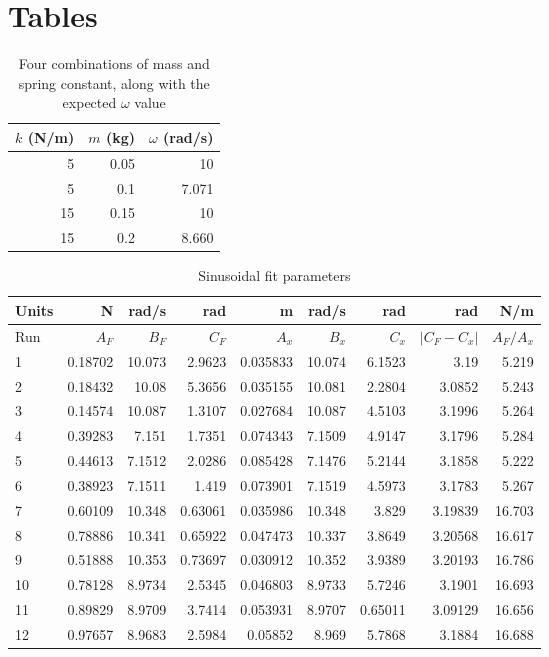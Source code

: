 \section{Tables}
%
\begin{table}[ht]
    \centering
    \begin{tabular}{|r|r|r|}\hline
        $k$ (N/m) & $m$ (kg) & $\omega$ (rad/s) \\ \hline
        5 & 0.05 & 10 \\
        5 & 0.1 & 7.071 \\
        15 & 0.15 & 10 \\
        15 & 0.2 & 8.660 \\
        \hline
    \end{tabular}
    \caption{Four combinations of mass and spring constant, along with the expected $\omega$ value}
    \label{table.11.parameters}
\end{table}
%
\begin{table}[ht]
    \centering
    \begin{tabular}{|l|r|r|r|r|r|r|r|r|}
        \hline
        Units & N & rad/s & rad & m & rad/s & rad & rad & N/m \\
        \hline
        Run & $A_{F}$ & $B_{F}$ & $C_{F}$ & $A_{x}$ & $B_{x}$ & $C_{x}$ & $\vert C_{F} - C_{x} \vert$ & $A_{F} / A_{x}$ \\
        \hline
        1 & 0.18702 & 10.073 & 2.9623 & 0.035833 & 10.074 & 6.1523 & 3.19 & 5.219 \\
        2 & 0.18432 & 10.08 & 5.3656 & 0.035155 & 10.081 & 2.2804 & 3.0852 & 5.243 \\
        3 & 0.14574 & 10.087 & 1.3107 & 0.027684 & 10.087 & 4.5103 & 3.1996 & 5.264 \\
        \hline
        4 & 0.39283 & 7.151 & 1.7351 & 0.074343 & 7.1509 & 4.9147 & 3.1796 & 5.284 \\
        5 & 0.44613 & 7.1512 & 2.0286 & 0.085428 & 7.1476 & 5.2144 & 3.1858 & 5.222 \\
        6 & 0.38923 & 7.1511 & 1.419 & 0.073901 & 7.1519 & 4.5973 & 3.1783 & 5.267 \\
        \hline
        7 & 0.60109 & 10.348 & 0.63061 & 0.035986 & 10.348 & 3.829 & 3.19839 & 16.703 \\
        8 & 0.78886 & 10.341 & 0.65922 & 0.047473 & 10.337 & 3.8649 & 3.20568 & 16.617 \\
        9 & 0.51888 & 10.353 & 0.73697 & 0.030912 & 10.352 & 3.9389 & 3.20193 & 16.786 \\
        \hline
        10 & 0.78128 & 8.9734 & 2.5345 & 0.046803 & 8.9733 & 5.7246 & 3.1901 & 16.693 \\
        11 & 0.89829 & 8.9709 & 3.7414 & 0.053931 & 8.9707 & 0.65011 & 3.09129 & 16.656 \\
        12 & 0.97657 & 8.9683 & 2.5984 & 0.05852 & 8.969 & 5.7868 & 3.1884 & 16.688 \\
        \hline
    \end{tabular}
    \caption{Sinusoidal fit parameters}
    \label{table.11.fit}
\end{table}
